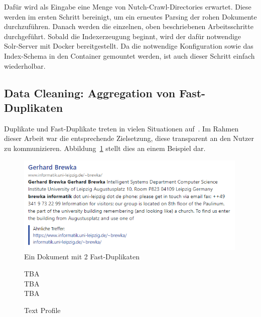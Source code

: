 Dafür wird als Eingabe eine Menge von Nutch-Crawl-Directories erwartet.
Diese werden im ersten Schritt bereinigt, um ein erneutes Parsing der rohen Dokumente durchzuführen.
Danach werden die einzelnen, oben beschriebenen Arbeitsschritte durchgeführt.
Sobald die Indexerzeugung beginnt, wird der dafür notwendige Solr-Server mit Docker
bereitgestellt. Da die notwendige Konfiguration sowie das Index-Schema in den Container gemountet werden,
ist auch dieser Schritt einfach wiederholbar.

\subsection{Data Cleaning: Aggregation von Fast-Duplikaten}
\label{chap:near_duplicate_detection}

Duplikate und Fast-Duplikate treten in vielen Situationen auf~\cite{croft.chap3}.
Im Rahmen dieser Arbeit war die entsprechende Zielsetzung, diese transparent an den Nutzer zu kommunizieren.
Abbildung~\ref{fig:grouped_sim} stellt dies an einem Beispiel dar.

\begin{figure}[!ht]
	\includegraphics[width=0.99\textwidth]{chapter_data_aqcuisition/grouped_duplicates.png}
	\caption{Ein Dokument mit 2 Fast-Duplikaten}
	\label{fig:grouped_sim}
\end{figure}

\begin{figure}
	\vspace*{-0.4cm}

\begin{scriptsize}
\begin{algorithm}[H]
		       

	TBA\\
	TBA\\
	TBA\\
	\caption{Text Profile}
	\label{alg:text_profile}
\end{algorithm}
\end{scriptsize}

	\vspace*{-0.2cm}
\end{figure}

